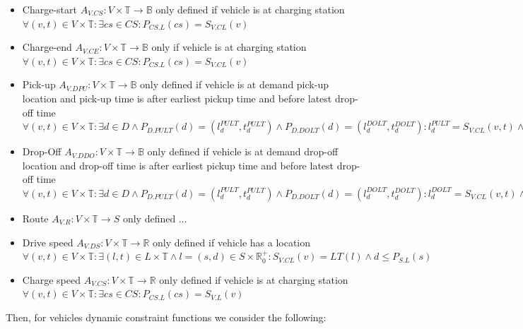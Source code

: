 \documentclass[graybox]{svmult}
\begin{document}
\begin{itemize}
	\item Charge-start $A_{V.CS}: V \times \mathbb{T} \rightarrow \mathbb{B}$ only defined if vehicle is at charging station $\forall (v,t) \in V \times \mathbb{T}: \exists cs \in CS: P_{CS.L}(cs) = S_{V.CL}(v)$
	\item Charge-end $A_{V.CE}: V \times \mathbb{T} \rightarrow \mathbb{B}$ only if vehicle is at charging station $\forall (v,t) \in V \times \mathbb{T}: \exists cs \in CS: P_{CS.L}(cs) = S_{V.CL}(v)$
	\item Pick-up $A_{V.DPU}: V \times \mathbb{T} \rightarrow \mathbb{B}$ only defined if vehicle is at demand pick-up location and pick-up time is after earliest pickup time and before latest drop-off time $\forall (v,t) \in V \times \mathbb{T}: \exists d \in D \wedge  P_{D.PULT}(d) = (l_d^{PULT},t_d^{PULT}) \wedge P_{D.DOLT}(d) = (l_d^{DOLT},t_d^{DOLT}): l_d^{PULT} = S_{V.CL}(v,t) \wedge t_d^{PULT} \leq t \leq t_d^{DOLT}$
	\item Drop-Off $A_{V.DDO}: V \times \mathbb{T} \rightarrow \mathbb{B}$ only defined if vehicle is at demand drop-off location and drop-off time is after earliest pickup time and before latest drop-off time $\forall (v,t) \in V \times \mathbb{T}: \exists d \in D \wedge  P_{D.PULT}(d) = (l_d^{PULT},t_d^{PULT}) \wedge P_{D.DOLT}(d) = (l_d^{DOLT},t_d^{DOLT}): l_d^{DOLT} = S_{V.CL}(v,t) \wedge t_d^{PULT} \leq t \leq t_d^{DOLT}$
	\item Route $A_{V.R}: V \times \mathbb{T} \rightarrow S$ only defined ...
	\item Drive speed $A_{V.DS}: V \times \mathbb{T} \rightarrow \mathbb{R}$ only defined if vehicle has a location $\forall (v,t) \in V \times \mathbb{T}: \exists (l, t) \in L \times \mathbb{T} \wedge l = (s, d) \in S \times \mathbb{R}_0^+: S_{V.CL}(v) = LT(l) \wedge d \leq P_{S.L}(s)$
	

	
	\item Charge speed $A_{V.CS}: V \times \mathbb{T} \rightarrow \mathbb{R}$ only defined if vehicle is at charging station $\forall (v,t) \in V \times \mathbb{T}: \exists cs \in CS: P_{CS.L}(cs) = S_{V.L}(v)$
\end{itemize}
Then, for vehicles dynamic constraint functions we consider the following:
\end{document}
